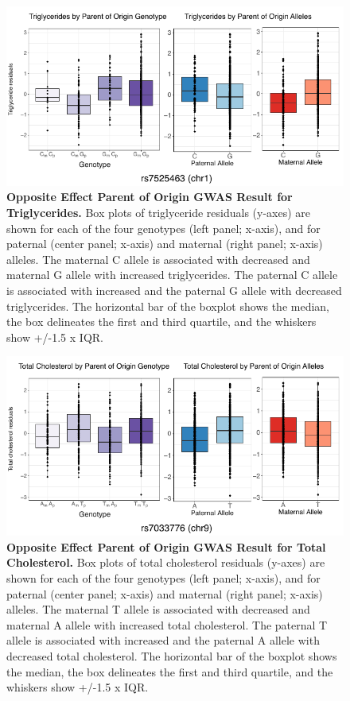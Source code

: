 \begin{figure}[!htb]
\centering
\includegraphics[width=5in]{img/ch02/fig-s10.pdf}
\caption[Opposite Effect Parent of Origin GWAS Result for Triglycerides.]{\textbf{Opposite Effect Parent of Origin GWAS Result for Triglycerides.}  Box plots of triglyceride residuals (y-axes) are shown for each of the four genotypes (left panel; x-axis), and for paternal (center panel; x-axis) and maternal (right panel; x-axis) alleles. The maternal C allele is associated with decreased and maternal G allele with increased triglycerides. The paternal C allele is associated with increased and the paternal G allele with decreased triglycerides. The horizontal bar of the boxplot shows the median, the box delineates the first and third quartile, and the whiskers show +/-1.5 x IQR.}
\label{fig:fig-s10}
\end{figure}

\begin{figure}[!htb]
\centering
\includegraphics[width=5in]{img/ch02/fig-s11.pdf}
\caption[Opposite Effect Parent of Origin GWAS Result for Total Cholesterol.]{\textbf{Opposite Effect Parent of Origin GWAS Result for Total Cholesterol.}  Box plots of total cholesterol residuals (y-axes) are shown for each of the four genotypes (left panel; x-axis), and for paternal (center panel; x-axis) and maternal (right panel; x-axis) alleles. The maternal T allele is associated with decreased and maternal A allele with increased total cholesterol. The paternal T allele is associated with increased and the paternal A allele with decreased total cholesterol. The horizontal bar of the boxplot shows the median, the box delineates the first and third quartile, and the whiskers show +/-1.5 x IQR.}
\label{fig:fig-s11}
\end{figure}

